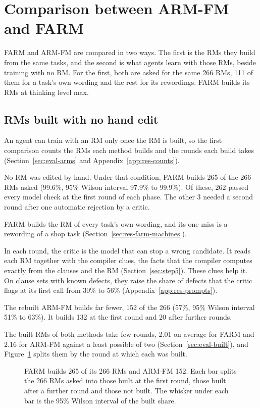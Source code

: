 \documentclass[11pt,english,listoffigures,listoftables]{tfgetsinf}
\begin{document}
\section{Comparison between ARM-FM and FARM}
\label{sec:res-comparison}

FARM and ARM-FM are compared in two ways. The first is the RMs they build from the same tasks, and the second is what agents learn with those RMs, beside training with no RM. For the first, both are asked for the same 266 RMs, 111 of them for a task's own wording and the rest for its rewordings. FARM builds its RMs at thinking level max.

\subsection{RMs built with no hand edit}
\label{sec:res-built}

An agent can train with an RM only once the RM is built, so the first comparison counts the RMs each method builds and the rounds each build takes (Section~\ref{sec:eval-arms} and Appendix~\ref{app:res-counts}).

No RM was edited by hand. Under that condition, FARM builds 265 of the 266 RMs asked (99.6\%, 95\% Wilson interval 97.9\% to 99.9\%). Of these, 262 passed every model check at the first round of each phase. The other 3 needed a second round after one automatic rejection by a critic.

FARM builds the RM of every task's own wording, and its one miss is a rewording of a shop task (Section~\ref{sec:res-farm-machines}).

In each round, the critic is the model that can stop a wrong candidate. It reads each RM together with the compiler clues, the facts that the compiler computes exactly from the clauses and the RM (Section~\ref{sec:step5}). These clues help it. On clause sets with known defects, they raise the share of defects that the critic flags at its first call from 30\% to 56\% (Appendix~\ref{app:res-prompts}).

The rebuilt ARM-FM builds far fewer, 152 of the 266 (57\%, 95\% Wilson interval 51\% to 63\%). It builds 132 at the first round and 20 after further rounds.

The built RMs of both methods take few rounds, 2.01 on average for FARM and 2.16 for ARM-FM against a least possible of two (Section~\ref{sec:eval-built}), and Figure~\ref{fig:res-built} splits them by the round at which each was built.

\begin{figure}[H]
\centering

\caption[RMs built per method]{FARM builds 265 of its 266 RMs and ARM-FM 152. Each bar splits the 266 RMs asked into those built at the first round, those built after a further round and those not built. The whisker under each bar is the 95\% Wilson interval of the built share.}
\label{fig:res-built}
\end{figure}
\end{document}
